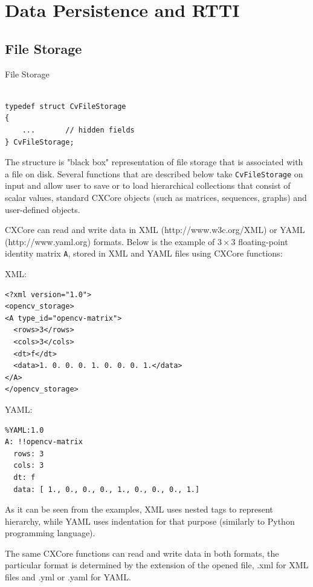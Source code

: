 \section{Data Persistence and RTTI}


\subsection{File Storage}

\label{CvFileStorage}

File Storage

\begin{lstlisting}

typedef struct CvFileStorage
{
    ...       // hidden fields
} CvFileStorage;

\end{lstlisting}

The structure  is "black box" representation
of file storage that is associated with a file on disk. Several
functions that are described below take \texttt{CvFileStorage} on
input and allow user to save or to load hierarchical collections
that consist of scalar values, standard CXCore objects (such as
matrices, sequences, graphs) and user-defined objects.

CXCore can read and write data in XML (http://www.w3c.org/XML) or YAML
(http://www.yaml.org) formats. Below is the example of $3 \times 3$
floating-point identity matrix \texttt{A}, stored in XML and YAML files
using CXCore functions:

XML:

\begin{verbatim}
<?xml version="1.0">
<opencv_storage>
<A type_id="opencv-matrix">
  <rows>3</rows>
  <cols>3</cols>
  <dt>f</dt>
  <data>1. 0. 0. 0. 1. 0. 0. 0. 1.</data>
</A>
</opencv_storage>
\end{verbatim}

YAML:

\begin{verbatim}
%YAML:1.0
A: !!opencv-matrix
  rows: 3
  cols: 3
  dt: f
  data: [ 1., 0., 0., 0., 1., 0., 0., 0., 1.]
\end{verbatim}

As it can be seen from the examples, XML uses nested tags to represent
hierarchy, while YAML uses indentation for that purpose (similarly
to Python programming language).

The same CXCore functions can read and write data in both formats,
the particular format is determined by the extension of the opened
file, .xml for XML files and .yml or .yaml for YAML.


